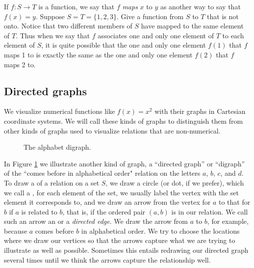 \item  If $f:S\rightarrow T$ is a function, we say that $f${\em 
maps}
$x$ to $y$ as another way to say that $f(x)=y$.  Suppose
$S=T=\{1,2,3\}$.  Give a function from
$S$ to
$T$ that is not onto.  Notice that two different members of $S$
have mapped to the same element of $T$.  Thus when we say that $f$
associates one and only one element of $T$ to each element of $S$,
it is quite possible that the one and only one element $f(1)$ that
$f$ maps 1 to is exactly the same as the one and only one element
$f(2)$ that $f$ maps 2 to.
\ep

\subsection{Directed graphs}\label{relationdigraph} We visualize
numerical functions like $f(x)=x^2$ with their graphs in
Cartesian coordinate systems.  We will call these kinds of graphs
 to distinguish them
from other kinds of graphs used to visualize relations that are
non-numerical. 
\begin{figure}[htb]\caption{The alphabet
digraph.}\label{alphabetdigraph}\smallskip
\begin{center}\mbox{}
\end{center}  
\end{figure}In Figure
\ref{alphabetdigraph} we illustrate another kind of graph, a
``directed graph'' or ``digraph'' of the ``comes before in
alphabetical order" relation on the letters $a$, $b$, $c$, and
$d$.  To draw a  of a relation on a set
$S$, we draw a circle (or dot, if we prefer), which we call a
, for
each element of the set, we usually label the vertex with the set
element it corresponds to, and we draw an arrow from the vertex
for $a$
 to that for  $b$ if $a$ is related to $b$, that is, if
the ordered pair
$(a,b)$ is in our relation.  We call such an arrow an  or a {\em directed edge}.  We draw
the arrow from
$a$ to
$b$, for example, because $a$ comes before $b$ in alphabetical
order.  We try to choose the locations where we draw our
vertices so that the arrows capture what we are trying to
illustrate as well as possible.  Sometimes this entails
redrawing our directed graph several times until we think the
arrows capture the relationship well.



